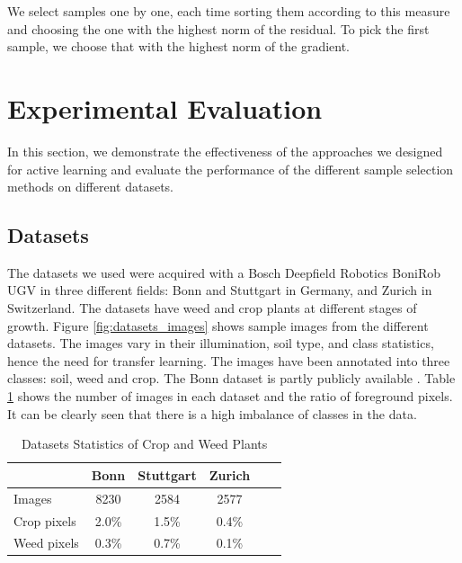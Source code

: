\documentclass[letterpaper, 10 pt, conference]{ieeeconf}  %
\begin{document}
We select samples one by one, each time sorting them according to this measure and choosing the one with the highest norm of the residual. To pick the first sample, we choose that with the highest norm of the gradient.



\section{Experimental Evaluation}
\label{sec:exp}

In this section, we demonstrate the effectiveness of the approaches we designed for active learning and evaluate the performance of the different sample selection methods on different datasets.


\subsection{Datasets}

The datasets we used were acquired with a Bosch Deepfield Robotics BoniRob UGV in three different fields: Bonn and Stuttgart in Germany, and Zurich in Switzerland. The datasets have weed and crop plants at different stages of growth. Figure \ref{fig:datasets_images} shows sample images from the different datasets. The images vary in their illumination, soil type, and class statistics, hence the need for transfer learning. The images have been annotated into three classes: soil, weed and crop. The Bonn dataset is partly publicly available \cite{chebrolu2017agricultural}. Table \ref{tab:datasets_stats} shows the number of images in each dataset and the ratio of foreground pixels. It can be clearly seen that there is a high imbalance of classes in the data.



    \begin{table}
       \vspace{1em}
        \centering
        \caption{Datasets Statistics of Crop and Weed Plants}
        \begin{tabular}{@{}lccccc@{}} 
            \toprule
              & Bonn & Stuttgart & Zurich \\ 
            \midrule 
    		  Images  & 8230 & 2584 & 2577 \\ \addlinespace
    		  Crop pixels & 2.0\% & 1.5\% & 0.4\%  \\ \addlinespace
    		  Weed pixels & 0.3\% & 0.7\% & 0.1\%  \\    
            \bottomrule
        \end{tabular}
        \label{tab:datasets_stats}
    \end{table}
    
\end{document}
